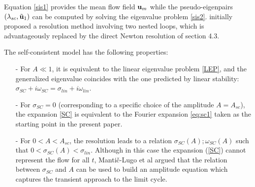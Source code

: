 \documentclass[twocolumn,10pt]{asme2ej}
\begin{document}
Equation \eqref{sis1} provides the mean flow field ${\bf u }_m$ while the 
pseudo-eigenpairs $(\lambda_{sc},  \tilde{{\bf u }}_1)$ can be computed by solving the eigenvalue problem \eqref{sis2}.
\cite{MLugo2014} initially proposed a resolution method involving two nested loops, which is advantageously replaced by
the direct Newton resolution of section 4.3. 


The self-consistent model has the following properties:
\begin{itemize}
\item[-] For $ A \ll 1$, it is equivalent to the linear eigenvalue problem \eqref{LEP}, and the generalized eigenvalue coincides with the one predicted by linear stability: $\sigma_{SC} + i \omega_{SC} = \sigma_{lin} + i \omega_{lin}$.
\item[-] For $\sigma_{SC}=0$ (corresponding to a specific choice of the amplitude $A=A_{sc}$), the expansion \eqref{SC} is equivalent to 
the Fourier expansion \eqref{eq:sc1} taken as the starting point in the present paper. 
\item[-] For $0<A<A_{sc}$, the resolution leads to a relation $\sigma_{SC}(A) ; \omega_{SC}(A)$
such that $0< \sigma_{SC}(A) < \sigma_{lin}$.
 Although in this case the expansion ({\ref{SC}}) cannot represent the flow for all $t$, Manti\v{c}-Lugo et al \cite{MLugo2014} argued that the relation between $\sigma_{SC}$ and $A$ can be used to build an amplitude equation which captures the transient approach to the limit cycle. 
\end{itemize}

\end{document}
